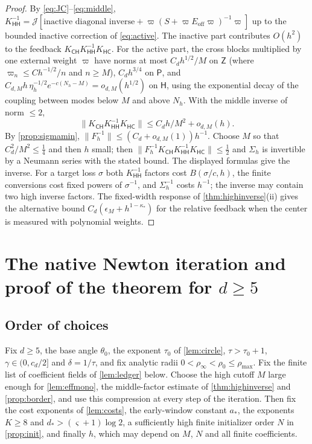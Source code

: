 \documentclass[11pt]{amsart}
\numberwithin{equation}{section}
\theoremstyle{definition}
\theoremstyle{remark}
\newcommand{\norm}[1]{\lVert #1\rVert}
\newcommand{\cJ}{\mathcal J}
\begin{document}
\begin{proof}
By \eqref{eq:JC}--\eqref{eq:middle}, $K_{\mathsf{HH}}^{-1}=\cJ[\text{inactive diagonal inverse}+\varpi(S+\varpi E_{\mathrm{off}}\varpi)^{-1}\varpi]$ up to the bounded inactive correction of \eqref{eq:active}. The inactive part contributes $O(h^2)$ to the feedback $K_{\mathsf{CH}}K_{\mathsf{HH}}^{-1}K_{\mathsf{HC}}$. For the active part, the cross blocks multiplied by one external weight $\varpi$ have norms at most $C_dh^{1/2}/M$ on $\mathsf Z$ (where $\varpi_n\le Ch^{-1/2}/n$ and $n\ge M$), $C_dh^{3/4}$ on $\mathsf P$, and $C_{d,M}h\,\eta_h^{-1/2}e^{-c(N_h-M)}=o_{d,M}(h^{1/2})$ on $\mathsf H$, using the exponential decay of the coupling between modes below $M$ and above $N_h$. With the middle inverse of norm $\le2$,
\[
\norm{K_{\mathsf{CH}}K_{\mathsf{HH}}^{-1}K_{\mathsf{HC}}}\le C_dh/M^2+o_{d,M}(h).
\]
By \cref{prop:sigmamin}, $\norm{F_h^{-1}}\le(C_d+o_{d,M}(1))h^{-1}$. Choose $M$ so that $C_d^2/M^2\le\frac14$ and then $h$ small; then $\norm{F_h^{-1}K_{\mathsf{CH}}K_{\mathsf{HH}}^{-1}K_{\mathsf{HC}}}\le\frac12$ and $\Sigma_h$ is invertible by a Neumann series with the stated bound. The displayed formulas give the inverse. For a target loss $\sigma$ both $K_{\mathsf{HH}}^{-1}$ factors cost $B(\sigma/c,h)$, the finite conversions cost fixed powers of $\sigma^{-1}$, and $\Sigma_h^{-1}$ costs $h^{-1}$; the inverse may contain two high inverse factors. The fixed-width response of \cref{thm:highinverse}(ii) gives the alternative bound $C_d(\epsilon_M+h^{1-\kappa_*})$ for the relative feedback when the center is measured with polynomial weights.
\end{proof}

\section{The native Newton iteration and proof of the theorem for \texorpdfstring{$d\ge5$}{d>=5}}\label{sec:newton}

\subsection{Order of choices}
Fix $d\ge5$, the base angle $\theta_0$, the exponent $\tau_0$ of \cref{lem:circle}, $\tau>\tau_0+1$, $\gamma\in(0,c_d/2]$ and $\delta=1/\tau$, and fix analytic radii $0<\rho_\infty<\rho_0\le\rho_{\max}$. Fix the finite list of coefficient fields of \cref{lem:ledger} below. Choose the high cutoff $M$ large enough for \cref{lem:effmono}, the middle-factor estimate of \cref{thm:highinverse} and \cref{prop:border}, and use this compression at every step of the iteration. Then fix the cost exponents of \cref{lem:costs}, the early-window constant $a_*$, the exponents $K\ge8$ and $d_*>(\varsigma+1)\log2$, a sufficiently high finite initializer order $N$ in \cref{prop:init}, and finally $h$, which may depend on $M$, $N$ and all finite coefficients.
\end{document}
